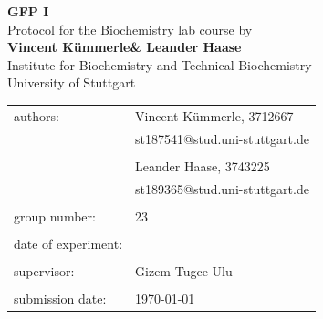 \documentclass[a4paper,12pt,bibliography=totocnumbered,parskip=half,headsepline]{scrartcl}
\makeatletter
\newcommand{\VERSUCHSDATUM}{\DTMdisplaydate{2026}{3}{13}{-1}}
\newcommand{\PROTOKOLLDATUM}{\today}
\newcommand{\VerfasserEINS}{Vincent Kümmerle}
\newcommand{\MatNoEINS}{3712667}
\newcommand{\EmailEINS}{st187541@stud.uni-stuttgart.de}
\newcommand{\VerfasserZWEI}{Leander Haase}
\newcommand{\MatNoZWEI}{3743225}
\newcommand{\EmailZWEI}{st189365@stud.uni-stuttgart.de}
\newcommand{\BETREUER}{Gizem Tugce Ulu}
\newcommand{\GRUPPENNR}{23}
\newcommand{\VERSUCHSNAME}{GFP I}
\makeatother
\begin{document}
\thispagestyle{empty}


\begin{titlepage}

\begin{center}
\Huge{\textbf{\VERSUCHSNAME}}\\
\vspace{10mm}%
\Large{Protocol for the Biochemistry lab course by \\ \textbf{\VerfasserEINS\;\& \VerfasserZWEI}}\\
\vspace{10mm}
\Large{Institute for Biochemistry and Technical Biochemistry}\\
\Large{University of Stuttgart}\\
\end{center}
\vspace{0cm}
\begin{center}
\begin{tabular}{ll}
\large{authors:}		& \large{\VerfasserEINS,} \large{\MatNoEINS} \\
 						& \large{\EmailEINS} \\
						\vspace{0cm}\\
						& \large{\VerfasserZWEI,} \large{\MatNoZWEI} \\
                        & \large{\EmailZWEI} \\
						\vspace{0cm}\\
\large{group number:}	& \large{\GRUPPENNR} \\
\vspace{0cm}\\
\large{date of experiment:}	& \large{\VERSUCHSDATUM} \\
\vspace{0cm}\\
\large{supervisor:}		& \large{\BETREUER} \\
\vspace{0cm}\\
\large{submission date:} & \large{\PROTOKOLLDATUM}
\end{tabular}
\end{center}

\vspace{1cm}


\end{titlepage}


\thispagestyle{empty}

\tableofcontents 
\end{document}
